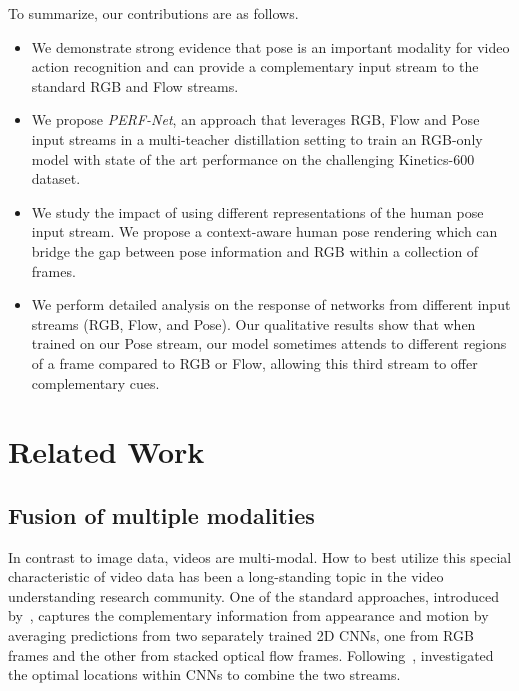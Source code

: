 \documentclass[letterpaper]{article} \usepackage{aaai21}  \usepackage{times}  \usepackage{helvet} \usepackage{courier}  \usepackage[hyphens]{url}  \usepackage{graphicx} \urlstyle{rm} \def\UrlFont{\rm}  \usepackage{natbib}  \usepackage{caption} \frenchspacing  \setlength{\pdfpagewidth}{8.5in}  \setlength{\pdfpageheight}{11in}
\begin{document}
To summarize, our contributions are as follows.
\begin{itemize}
\item We demonstrate strong evidence that pose is an important modality for video action recognition and can provide a complementary input stream to the standard RGB and Flow streams. 
\item We propose \emph{PERF-Net}, an approach that leverages RGB, Flow and Pose input streams in a multi-teacher distillation setting to train an RGB-only model with state of the art performance on the challenging Kinetics-600 dataset.
\item We study the impact of using different representations of the human pose input stream. We propose a context-aware human pose rendering which can bridge the gap between pose information and RGB within a collection of frames.
\item We perform detailed analysis on the response of networks from different input streams (RGB, Flow, and Pose).  Our 
qualitative   results show that when trained on our Pose stream, our model sometimes attends to different regions of a frame compared to RGB or Flow, allowing this third stream to offer complementary cues.


\end{itemize}























\section{Related Work}\label{sec:related}
\subsection{Fusion of multiple modalities}
In contrast to image data, videos are multi-modal. How to best utilize this special characteristic of video data has been a long-standing topic in the video understanding research community. One of the standard approaches, introduced by~\citet{Simonyan2}, captures the complementary information from appearance and motion by averaging predictions from two separately trained 2D CNNs, one from RGB frames and the other from stacked optical flow frames. Following~\cite{Simonyan2}, 
\citet{feichtenhofer2016convolutional} investigated the optimal locations within CNNs to combine the two streams.
\end{document}

